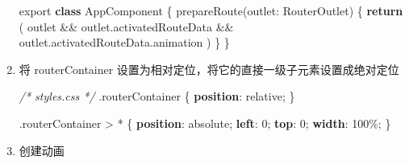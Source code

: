 \documentclass[
]{article}
\newenvironment{Shaded}{}{}
\newcommand{\AttributeTok}[1]{\textcolor[rgb]{0.49,0.56,0.16}{#1}}
\newcommand{\CommentTok}[1]{\textcolor[rgb]{0.38,0.63,0.69}{\textit{#1}}}
\newcommand{\ControlFlowTok}[1]{\textcolor[rgb]{0.00,0.44,0.13}{\textbf{#1}}}
\newcommand{\DataTypeTok}[1]{\textcolor[rgb]{0.56,0.13,0.00}{#1}}
\newcommand{\DecValTok}[1]{\textcolor[rgb]{0.25,0.63,0.44}{#1}}
\newcommand{\FunctionTok}[1]{\textcolor[rgb]{0.02,0.16,0.49}{#1}}
\newcommand{\ImportTok}[1]{#1}
\newcommand{\KeywordTok}[1]{\textcolor[rgb]{0.00,0.44,0.13}{\textbf{#1}}}
\newcommand{\NormalTok}[1]{#1}
\newcommand{\OperatorTok}[1]{\textcolor[rgb]{0.40,0.40,0.40}{#1}}
\begin{document}
\begin{enumerate}
\begin{Shaded}
\begin{Highlighting}[]
\ImportTok{export} \KeywordTok{class}\NormalTok{ AppComponent \{}
  \FunctionTok{prepareRoute}\NormalTok{(}\DataTypeTok{outlet}\OperatorTok{:}\NormalTok{ RouterOutlet) \{}
    \ControlFlowTok{return}\NormalTok{ (}
\NormalTok{      outlet }\OperatorTok{\&\&}
\NormalTok{      outlet}\OperatorTok{.}\AttributeTok{activatedRouteData} \OperatorTok{\&\&}
\NormalTok{      outlet}\OperatorTok{.}\AttributeTok{activatedRouteData}\OperatorTok{.}\AttributeTok{animation}
\NormalTok{    )}
\NormalTok{  \}}
\NormalTok{\}}
\end{Highlighting}
\end{Shaded}
\item
  将 routerContainer 设置为相对定位，将它的直接一级子元素设置成绝对定位

\begin{Shaded}
\begin{Highlighting}[]
\CommentTok{/* styles.css */}
\FunctionTok{.routerContainer}\NormalTok{ \{}
  \KeywordTok{position}\NormalTok{: }\DecValTok{relative}\OperatorTok{;}
\NormalTok{\}}

\FunctionTok{.routerContainer} \OperatorTok{\textgreater{}} \OperatorTok{*}\NormalTok{ \{}
  \KeywordTok{position}\NormalTok{: }\DecValTok{absolute}\OperatorTok{;}
  \KeywordTok{left}\NormalTok{: }\DecValTok{0}\OperatorTok{;}
  \KeywordTok{top}\NormalTok{: }\DecValTok{0}\OperatorTok{;}
  \KeywordTok{width}\NormalTok{: }\DecValTok{100}\DataTypeTok{\%}\OperatorTok{;}
\NormalTok{\}}
\end{Highlighting}
\end{Shaded}
\item
  创建动画


\end{enumerate}
\end{document}

